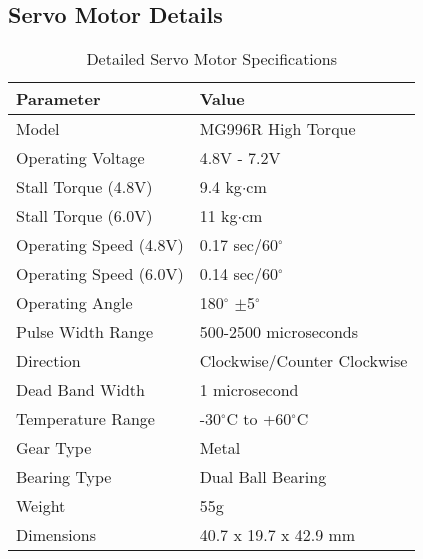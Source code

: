 \documentclass[12pt,a4paper]{report}
\begin{document}
\subsection{Servo Motor Details}
\begin{table}[h]
\centering
\begin{tabular}{|l|l|}
\hline
\textbf{Parameter} & \textbf{Value} \\
\hline
Model & MG996R High Torque \\
Operating Voltage & 4.8V - 7.2V \\
Stall Torque (4.8V) & 9.4 kg$\cdot$cm \\
Stall Torque (6.0V) & 11 kg$\cdot$cm \\
Operating Speed (4.8V) & 0.17 sec/60$^{\circ}$ \\
Operating Speed (6.0V) & 0.14 sec/60$^{\circ}$ \\
Operating Angle & 180$^{\circ}$ $\pm$5$^{\circ}$ \\
Pulse Width Range & 500-2500 microseconds \\
Direction & Clockwise/Counter Clockwise \\
Dead Band Width & 1 microsecond \\
Temperature Range & -30$^{\circ}$C to +60$^{\circ}$C \\
Gear Type & Metal \\
Bearing Type & Dual Ball Bearing \\
Weight & 55g \\
Dimensions & 40.7 x 19.7 x 42.9 mm \\
\hline
\end{tabular}
\caption{Detailed Servo Motor Specifications}
\end{table}
\end{document}
